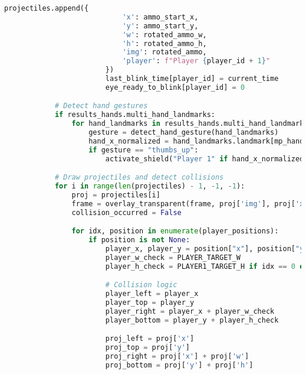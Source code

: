 \documentclass[11pt,a4paper]{article}
\begin{document}
\begin{lstlisting}[language=Python, caption=fungsi main]
                        projectiles.append({
                            'x': ammo_start_x,
                            'y': ammo_start_y,
                            'w': rotated_ammo_w,
                            'h': rotated_ammo_h,
                            'img': rotated_ammo,
                            'player': f"Player {player_id + 1}"
                        })
                        last_blink_time[player_id] = current_time
                        eye_ready_to_blink[player_id] = 0

            # Detect hand gestures
            if results_hands.multi_hand_landmarks:
                for hand_landmarks in results_hands.multi_hand_landmarks:
                    gesture = detect_hand_gesture(hand_landmarks)
                    hand_x_normalized = hand_landmarks.landmark[mp_hands.HandLandmark.WRIST].x
                    if gesture == "thumbs_up":
                        activate_shield("Player 1" if hand_x_normalized < 0.5 else "Player 2")

            # Draw projectiles and detect collisions
            for i in range(len(projectiles) - 1, -1, -1):
                proj = projectiles[i]
                frame = overlay_transparent(frame, proj['img'], proj['x'], proj['y'], (proj['w'], proj['h']))
                collision_occurred = False

                for idx, position in enumerate(player_positions):
                    if position is not None:
                        player_x, player_y = position["x"], position["y"]
                        player_w_check = PLAYER_TARGET_W
                        player_h_check = PLAYER1_TARGET_H if idx == 0 else PLAYER2_TARGET_H

                        # Collision logic
                        player_left = player_x
                        player_top = player_y
                        player_right = player_x + player_w_check
                        player_bottom = player_y + player_h_check

                        proj_left = proj['x']
                        proj_top = proj['y']
                        proj_right = proj['x'] + proj['w']
                        proj_bottom = proj['y'] + proj['h']


\end{lstlisting}
\end{document}
